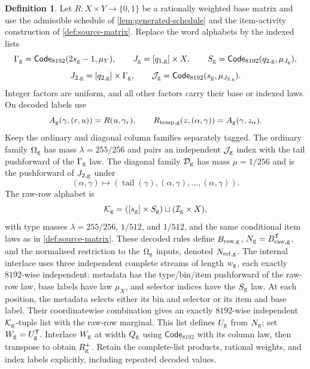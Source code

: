 \documentclass[11pt]{article} \usepackage[utf8]{inputenc}
\theoremstyle{plain} \newtheorem{theorem}{Theorem}[section]
\theoremstyle{definition} \newaliascnt{definition}{theorem}
\newtheorem{definition}[definition]{Definition} \aliascntresetthe{definition}
\begin{document}
\begin{definition}\label{det:construction}
Let \(R:X\times Y\to\{0,1\}\) be a rationally weighted base matrix and use the
admissible schedule of \cref{lem:generated-schedule} and the item-activity
construction of \cref{def:source-matrix}.
Replace the word alphabets by the indexed lists
\[
\Gamma_{\rm g}=\mathsf{Code}_{8192}(2s_{\rm g}-1,\mu_Y),\qquad J_{\rm
g}=[q_{1,\rm g}]\times X,\qquad S_{\rm g}=\mathsf{Code}_{8192}(q_{2,\rm
g},\mu_{J_{\rm g}}),
\]
\[
J_{2,\rm g}=[q_{2,\rm g}]\times\Gamma_{\rm g},\qquad \mathcal J_{\rm
g}=\mathsf{Code}_{8192}(s_{\rm g},\mu_{J_{2,\rm g}}).
\]
Integer factors are uniform, and all other factors carry their base or indexed
laws. On decoded labels use
\[
A_{\rm g}(\gamma,(r,u))=R(u,\gamma_r),\qquad R_{\rm temp,g}(z,(\alpha,\gamma))=A_{\rm g}(\gamma,z_\alpha).
\]
Keep the ordinary and diagonal column families separately tagged.
The ordinary family $\Omega_{\rm g}$ has mass $\lambda=255/256$ and pairs
an independent $\mathcal J_{\rm g}$ index with the tail pushforward of the
$\Gamma_{\rm g}$ law. The diagonal family $\mathcal D_{\rm g}$ has mass
$\mu=1/256$ and is the pushforward of $J_{2,\rm g}$ under
\[
(\alpha,\gamma)\longmapsto
(\operatorname{tail}(\gamma),(\alpha,\gamma),\ldots,(\alpha,\gamma)).
\]
The raw-row alphabet is
\[
\mathcal K_{\rm g}=([s_{\rm g}]\times S_{\rm g})\sqcup(\mathcal I_{\rm g}\times
X),
\]
with type masses \(\lambda=255/256\), \(1/512\), and \(1/512\), and the same
conditional item laws as in \cref{def:source-matrix}. These decoded rules define
\(B_{\rm raw,g}\), \(N_{\rm g}=B_{\rm raw,g}^{\mathsf T}\), and the normalised
restriction to the \(\Omega_{\rm g}\) inputs, denoted
\(N_{\rm ref,g}\). The internal interlace uses three independent complete
streams of length \(w_{\rm g}\), each exactly \(8192\)-wise independent:
metadata has the type/bin/item pushforward of the raw-row law, base labels have
law \(\mu_X\), and selector indices have the \(S_{\rm g}\) law. At each
position, the metadata selects either its bin and selector or its item and base
label. Their coordinatewise combination gives an exactly \(8192\)-wise
independent \(\mathcal K_{\rm g}\)-tuple list with the raw-row marginal. This
list defines \(U_{\rm g}\) from \(N_{\rm g}\); set \(W_{\rm g}=U_{\rm
g}^{\mathsf T}\). Interlace \(W_{\rm g}\) at width \(Q_{\rm g}\) using
\(\mathsf{Code}_{8192}\) with its column law, then transpose to obtain \(R_{\rm
g}^{+}\). Retain the complete-list products, rational weights, and index labels
explicitly, including repeated decoded values.
\end{definition}
\end{document}
